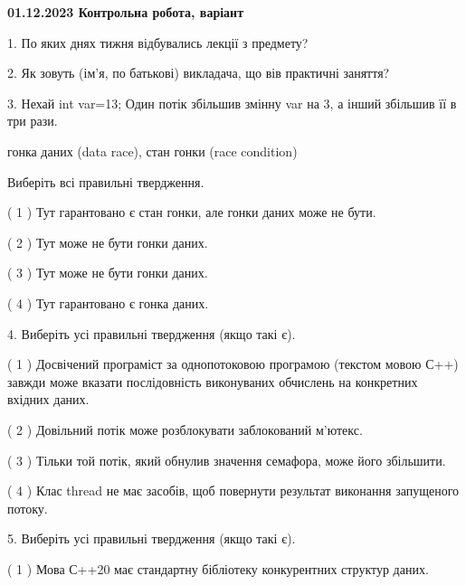 \documentclass[12pt, ukrainian]{article}
\begin{document}
\vspace{4mm}
\newpage
\begin {large}

\textbf{01.12.2023 Контрольна робота, варіант  }\par


{
1. По яких днях тижня відбувались лекції з предмету?



\vspace{5mm}
2. Як зовуть (ім'я, по батькові) викладача, що вів практичні заняття?



\vspace{5mm}
3. Нехай int var=13; Один потік збільшив змінну var на 3, а інший збільшив її в три рази.

гонка даних (data race), стан гонки (race condition)

Виберіть всі правильні твердження.\par
\vspace{2mm}
( 1 ) Тут гарантовано є стан гонки, але гонки даних може не бути.%

( 2 ) Тут може не бути гонки даних.%

( 3 ) Тут може не бути гонки даних.%

( 4 ) Тут гарантовано є гонка даних.%


\vspace{5mm}
4. Виберіть усі правильні твердження (якщо такі є).\par
\vspace{2mm}

( 1 ) Досвічений програміст за однопотоковою програмою (текстом мовою С++) завжди може вказати послідовність виконуваних обчислень на конкретних вхідних даних.%

( 2 ) Довільний потік може розблокувати заблокований м’ютекс.%

( 3 ) Тільки той потік, який обнулив значення семафора, може його збільшити.%

( 4 ) Клас thread не має засобів, щоб повернути результат виконання запущеного потоку.%


\vspace{5mm}
5. Виберіть усі правильні твердження (якщо такі є).\par
\vspace{2mm}

( 1 ) Мова С++20 має стандартну бібліотеку конкурентних структур даних.%

}
\end{large}
\end{document}
